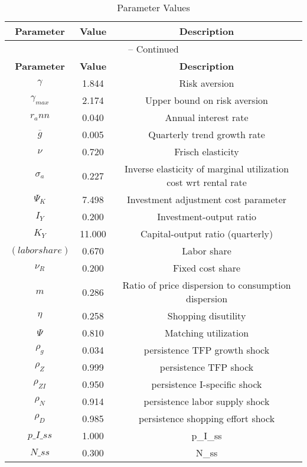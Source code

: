 \begin{center}
\begin{longtable}{ccc}
\caption{Parameter Values}\\%
\toprule%
\multicolumn{1}{c}{\textbf{Parameter}} &
\multicolumn{1}{c}{\textbf{Value}} &
 \multicolumn{1}{c}{\textbf{Description}}\\%
\midrule%
\endfirsthead
\multicolumn{3}{c}{{\tablename} \thetable{} -- Continued}\\%
\midrule%
\multicolumn{1}{c}{\textbf{Parameter}} &
\multicolumn{1}{c}{\textbf{Value}} &
  \multicolumn{1}{c}{\textbf{Description}}\\%
\midrule%
\endhead
${\gamma}$ 	 & 	 1.844 	 & 	 Risk aversion\\
${\gamma_{max}}$ 	 & 	 2.174 	 & 	 Upper bound on risk aversion\\
${r_ann}$ 	 & 	 0.040 	 & 	 Annual interest rate\\
${\overline{g}}$ 	 & 	 0.005 	 & 	 Quarterly trend growth rate\\
$\nu$ 	 & 	 0.720 	 & 	 Frisch elasticity\\
${\sigma_a}$ 	 & 	 0.227 	 & 	 Inverse elasticity of marginal utilization cost wrt rental rate\\
${\Psi_K}$ 	 & 	 7.498 	 & 	 Investment adjustment cost parameter\\
${I_Y}$ 	 & 	 0.200 	 & 	 Investment-output ratio\\
${K_Y}$ 	 & 	 11.000 	 & 	 Capital-output ratio (quarterly)\\
$(labor share)$ 	 & 	 0.670 	 & 	 Labor share\\
${\nu_R}$ 	 & 	 0.200 	 & 	 Fixed cost share\\
${m}$ 	 & 	 0.286 	 & 	 Ratio of price dispersion to consumption dispersion\\
${\eta}$ 	 & 	 0.258 	 & 	 Shopping disutility\\
${\Psi}$ 	 & 	 0.810 	 & 	 Matching utilization\\
${\rho_g}$ 	 & 	 0.034 	 & 	 persistence TFP growth shock\\
${\rho_Z}$ 	 & 	 0.999 	 & 	 persistence TFP shock\\
${\rho_{ZI}}$ 	 & 	 0.950 	 & 	 persistence I-specific shock\\
${\rho_N}$ 	 & 	 0.914 	 & 	 persistence labor supply shock\\
${\rho_D}$ 	 & 	 0.985 	 & 	 persistence shopping effort shock\\
$p\_I\_ss$ 	 & 	 1.000 	 & 	 p\_I\_ss\\
$N\_ss$ 	 & 	 0.300 	 & 	 N\_ss\\
\bottomrule%
\end{longtable}
\end{center}

